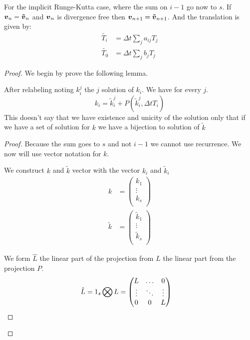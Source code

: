 \begin{theorem}
For the implicit Runge-Kutta case, where the sum on $i-1$ go now to $s$.
If ${\boldsymbol {v}}_{n}={\boldsymbol {\tilde{v}}}_{n}$ and ${\boldsymbol {v}}_n$ is divergence free then ${\boldsymbol {v}}_{n+1}={\boldsymbol {\tilde{v}}}_{n+1}$.
And the translation is given by:
\begin{align}
  \tilde{T_{i}}&=\Delta t\sum_{j}a_{ij}T_{j}\\
  \tilde{T_{0}}&=\Delta t\sum_{j}b_{j}T_{j}
\end{align}

\end{theorem}
\begin{proof}
We begin by prove the following lemma.
\begin{lemma}
After relabeling noting $k_{i}^{j}$ the $j$ solution of $k_{i}$.
We have for every $j$.
\begin{equation}
  k_{i}=\tilde{k}_{i}^{j}+P(\tilde{k}_{i}^{j},\Delta t T_{i})
\end{equation}
This doesn't say that we have existence and unicity of the solution only that if we have a set of solution for $k$ we have a bijection
to solution of $\tilde{k}$
\end{lemma}
\begin{proof}
Because the sum goes to $s$ and not $i-1$ we cannot use recurrence.
We now will use vector notation for $k$.

We construct $k$ and $\tilde{k}$ vector with the vector $k_{i}$ and $\tilde{k}_{i}$
\begin{align}
k&=\begin{pmatrix}
    k_{1}\\
    \vdots\\
    k_{s}\\
  \end{pmatrix}\\
\tilde{k}&=\begin{pmatrix}
    \tilde{k}_{1}\\
    \vdots\\
    \tilde{k}_{s}\\
  \end{pmatrix}
\end{align}

We form $\hat{L}$ the linear part of the projection from $L$ the linear part from the projection $P$.
\begin{align}
\hat{L}&=1_{s}\bigotimes L=\begin{pmatrix}L	&\ldots	&0\\
			\vdots &\ddots 	&\vdots\\
			0	&0	&L\\
	\end{pmatrix}
\end{align}



\end{proof}
\end{proof}
